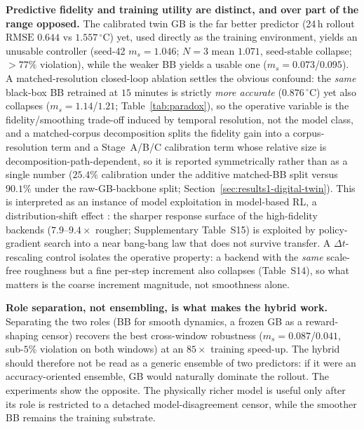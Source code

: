 \documentclass[a4paper,fleqn]{cas-sc}
\newcommand{\RMSE}{\ensuremath{\mathrm{RMSE}}}
\newcommand{\suppref}[1]{#1}
\begin{document}
\textbf{Predictive fidelity and training utility are distinct, and over part of the range opposed.} The calibrated twin GB is the far better predictor (24\,h rollout \RMSE{} $0.644$ vs $1.557\,^{\circ}$C) yet, used directly as the training environment, yields an unusable controller (seed-42 $m_s=1.046$; $N=3$ mean $1.071$, seed-stable collapse; $>77\%$ violation), while the weaker BB yields a usable one ($m_s=0.073$/$0.095$). A matched-resolution closed-loop ablation settles the obvious confound: the \emph{same} black-box BB retrained at $15$ minutes is strictly \emph{more accurate} ($0.876\,^{\circ}$C) yet also collapses ($m_s=1.14$/$1.21$; Table~\ref{tab:paradox}), so the operative variable is the fidelity/smoothing trade-off induced by temporal resolution, not the model class, and a matched-corpus decomposition splits the fidelity gain into a corpus-resolution term and a Stage~A/B/C calibration term whose relative size is decomposition-path-dependent, so it is reported symmetrically rather than as a single number ($25.4\%$ calibration under the additive matched-BB split versus $90.1\%$ under the raw-GB-backbone split; Section~\ref{sec:results1-digital-twin}). This is interpreted as an instance of model exploitation in model-based RL, a distribution-shift effect \citep{Quinonero2009DatasetShift,RiahiSamani2026OOD}: the sharper response surface of the high-fidelity backends ($7.9$--$9.4\times$ rougher; Supplementary Table~\suppref{S15}) is exploited by policy-gradient search into a near bang-bang law that does not survive transfer. A $\Delta t$-rescaling control isolates the operative property: a backend with the \emph{same} scale-free roughness but a fine per-step increment also collapses (Table~\suppref{S14}), so what matters is the coarse increment magnitude, not smoothness alone.

\textbf{Role separation, not ensembling, is what makes the hybrid work.} Separating the two roles (BB for smooth dynamics, a frozen GB as a reward-shaping censor) recovers the best cross-window robustness ($m_s=0.087$/$0.041$, sub-$5\%$ violation on both windows) at an $85\times$ training speed-up. The hybrid should therefore not be read as a generic ensemble of two predictors: if it were an accuracy-oriented ensemble, GB would naturally dominate the rollout. The experiments show the opposite. The physically richer model is useful only after its role is restricted to a detached model-disagreement censor, while the smoother BB remains the training substrate.
\end{document}
